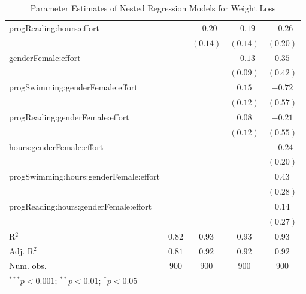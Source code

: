 \documentclass[
]{article}
\begin{document}
\begin{table}
\begin{center}
\begin{tabular}{l c c c c}
progReading:hours:effort               &                & $-0.20$        & $-0.19$        & $-0.26$       \\
                                       &                & $(0.14)$       & $(0.14)$       & $(0.20)$      \\
genderFemale:effort                    &                &                & $-0.13$        & $0.35$        \\
                                       &                &                & $(0.09)$       & $(0.42)$      \\
progSwimming:genderFemale:effort       &                &                & $0.15$         & $-0.72$       \\
                                       &                &                & $(0.12)$       & $(0.57)$      \\
progReading:genderFemale:effort        &                &                & $0.08$         & $-0.21$       \\
                                       &                &                & $(0.12)$       & $(0.55)$      \\
hours:genderFemale:effort              &                &                &                & $-0.24$       \\
                                       &                &                &                & $(0.20)$      \\
progSwimming:hours:genderFemale:effort &                &                &                & $0.43$        \\
                                       &                &                &                & $(0.28)$      \\
progReading:hours:genderFemale:effort  &                &                &                & $0.14$        \\
                                       &                &                &                & $(0.27)$      \\
\hline
R$^2$                                  & $0.82$         & $0.93$         & $0.93$         & $0.93$        \\
Adj. R$^2$                             & $0.81$         & $0.92$         & $0.92$         & $0.92$        \\
Num. obs.                              & $900$          & $900$          & $900$          & $900$         \\
\hline
\multicolumn{5}{l}{\scriptsize{$^{***}p<0.001$; $^{**}p<0.01$; $^{*}p<0.05$}}
\end{tabular}
\caption{Parameter Estimates of Nested Regression Models for Weight Loss}
\label{table:coefficients}
\end{center}
\end{table}
\end{document}
